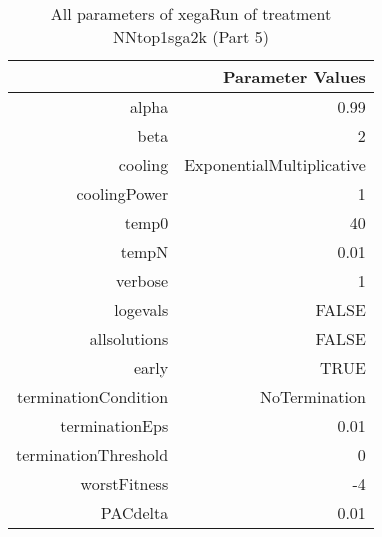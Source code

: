 \begin{table}[ht]
\centering
\begin{tabular}{rr}
  \hline
 & Parameter Values \\ 
  \hline
alpha & 0.99 \\ 
  beta & 2 \\ 
  cooling & ExponentialMultiplicative \\ 
  coolingPower & 1 \\ 
  temp0 & 40 \\ 
  tempN & 0.01 \\ 
  verbose & 1 \\ 
  logevals & FALSE \\ 
  allsolutions & FALSE \\ 
  early & TRUE \\ 
  terminationCondition & NoTermination \\ 
  terminationEps & 0.01 \\ 
  terminationThreshold & 0 \\ 
  worstFitness & -4 \\ 
  PACdelta & 0.01 \\ 
   \hline
\end{tabular}
\caption{ All parameters of xegaRun of treatment NNtop1sga2k 
 (Part 5)} 
\end{table}
